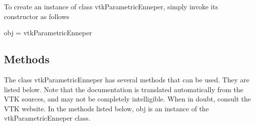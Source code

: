 To create an instance of class vtk\-Parametric\-Enneper, simply invoke its constructor as follows \begin{DoxyVerb}  obj = vtkParametricEnneper
\end{DoxyVerb}
 \hypertarget{vtkwidgets_vtkxyplotwidget_Methods}{}\subsection{Methods}\label{vtkwidgets_vtkxyplotwidget_Methods}
The class vtk\-Parametric\-Enneper has several methods that can be used. They are listed below. Note that the documentation is translated automatically from the V\-T\-K sources, and may not be completely intelligible. When in doubt, consult the V\-T\-K website. In the methods listed below, {\ttfamily obj} is an instance of the vtk\-Parametric\-Enneper class. 
